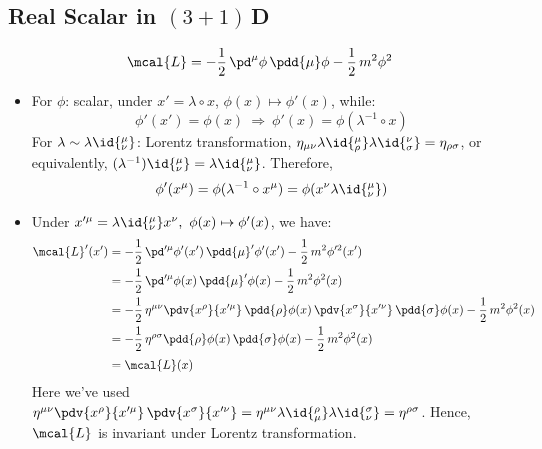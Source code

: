\documentclass[a4paper,10pt]{article}
\begin{document}
\subsection{Real Scalar in $(3+1)$\,D}
	\vspace{-.8\baselineskip}
	\begin{equation}
		\mcal{L}
		= -\frac{1}{2}\,
			\pd^\mu\phi\,
			\pdd{\mu}\phi
		-\frac{1}{2}\,m^2\phi^2
	\end{equation}
	\begin{itemize}
	\item For $\phi$: scalar, under $
		x' = \lambda\circ x
	$, $\phi(x)\mapsto \phi'(x)$, while:
	\begin{equation}
		\phi'(x') = \phi(x)
		\ \Longrightarrow\ %
		\phi'(x) = \phi(\lambda^{-1}\circ x)
	\end{equation}
	For $\lambda\sim \lambda\id{^\mu_\nu}$: Lorentz transformation, $
		\eta_{\mu\nu}
			\lambda\id{^\mu_\rho}
			\lambda\id{^\nu_\sigma}
		= \eta_{\rho\sigma}
	$, or equivalently, $
		(\lambda^{-1})\id{^\mu_\nu}
		= \lambda\id{_\nu^\mu}
	$. Therefore,
	\begin{equation}
		\phi'(x^\mu) = \phi(\lambda^{-1}\circ x^\mu)
		= \phi(x^\nu\lambda\id{_\nu^\mu})
	\end{equation}
\pagebreak[3]
	
	\item Under $
		x'^\mu = \lambda\id{^\mu_\nu} x^\nu,\ %
		\phi(x)\mapsto\phi'(x)
	$, we have:
	\begin{equation}
	\begin{aligned}
		\mcal{L}'(x')
		&= - \frac{1}{2}\,
			\pd'^\mu\phi'(x')\,
			\pdd{\mu}'\phi'(x')
		- \frac{1}{2}\,m^2\phi'^2(x') \\
		&= - \frac{1}{2}\,
			\pd'^\mu\phi(x)\,
			\pdd{\mu}'\phi(x)
		- \frac{1}{2}\,m^2\phi^2(x) \\
		&= - \frac{1}{2}\,
			\eta^{\mu\nu}
			\pdv{x^\rho}{x'^\mu}\,
			\pdd{\rho}\phi(x)\,
			\pdv{x^\sigma}{x'^\nu}\,
			\pdd{\sigma}\phi(x)
		- \frac{1}{2}\,m^2\phi^2(x) \\
		&= - \frac{1}{2}\,
			\eta^{\rho\sigma}
			\pdd{\rho}\phi(x)\,
			\pdd{\sigma}\phi(x)
		- \frac{1}{2}\,m^2\phi^2(x) \\[.5ex]
		&= \mcal{L}(x)
	\end{aligned}
	\end{equation}
	Here we've used $
		\eta^{\mu\nu}
		\pdv{x^\rho}{x'^\mu}\,
		\pdv{x^\sigma}{x'^\nu}
		= \eta^{\mu\nu}
			\lambda\id{_\mu^\rho}
			\lambda\id{_\nu^\sigma}
		= \eta^{\rho\sigma}
	$. Hence, $\mcal{L}$ is invariant under Lorentz transformation. 
	

\end{itemize}
\end{document}
